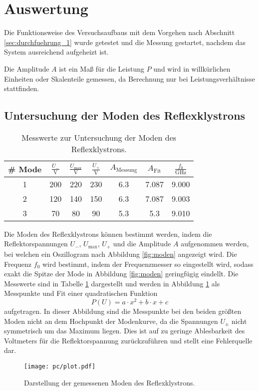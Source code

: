 \section{Auswertung}
\label{sec:Auswertung}
Die Funktionsweise des Versuchsaufbaus mit dem Vorgehen nach Abschnitt \ref{sec:durchfuehrung_1} wurde getestet
und die Messung gestartet, 
nachdem das System ausreichend aufgeheizt ist.

Die Amplitude $A$ ist ein Maß für die Leistung $P$ und wird in willkürlichen Einheiten oder Skalenteile gemessen,
da Berechnung nur bei Leistungsverhältnisse stattfinden.
%
\subsection{Untersuchung der Moden des Reflexklystrons}
%
\begin{table}
\centering
\caption{Messwerte zur Untersuchung der Moden des Reflexklystrons.}
\begin{tabular}{c cccccc}
	\toprule
	{\# Mode} &$\frac{U_-}{\si{\volt}}$ &$\frac{U_\text{max}}{\si{\volt}}$ &$\frac{U_+}{\si{\volt}}$ &$A_\text{Messung}$ &$A_\text{Fit}$ &$\frac{f_0}{\si{\giga\hertz}}$\\
	\midrule
		1 &200 	&220 &230 	&6.3 &7.087 &9.000 \\
		2 &120 	&140 &150 	&6.3 &7.087 &9.003 \\
		3 &70 	& 80 &90 	&5.3 &5.3 &9.010 \\
	\bottomrule
\end{tabular}
\label{tab:moden}
\end{table}

Die Moden des Reflexklystrons können bestimmt werden,
indem die Reflektorspannungen $U_-$, $U_\text{max}$, $U_+$ und die Amplitude $A$ aufgenommen werden, 
bei welchen ein Oszillogram nach Abbildung \ref{fig:moden} angezeigt wird.
Die Frequenz $f_0$ wird bestimmt, indem der Frequenzmesser so eingestellt wird, sodass exakt die Spitze der Mode in Abbildung \ref{fig:moden} geringfügig eindellt.
Die Messwerte sind in Tabelle \ref{tab:moden} dargestellt und werden in Abbildung \ref{plt:moden} als Messpunkte und Fit einer quadratischen Funktion 
%
\begin{equation}
	P(U)= a\cdot x^2 + b\cdot x + c
	\label{eq:quadfkt}
\end{equation}
%
aufgetragen.
In dieser Abbildung sind die Messpunkte bei den beiden größten Moden nicht an dem Hochpunkt der Modenkurve, 
da die Spannungen $U_\pm$ nicht symmetrisch um das Maximum liegen.
Dies ist auf zu geringe Ablesbarkeit des Voltmeters für die Reflektorspannung zurückzuführen und stellt eine Fehlerquelle dar.
\begin{figure}
  \centering
  \texttt{[image: pc/plot.pdf]}
  \caption{Darstellung der gemessenen Moden des Reflexklystrons.}
  \label{plt:moden}
\end{figure}

